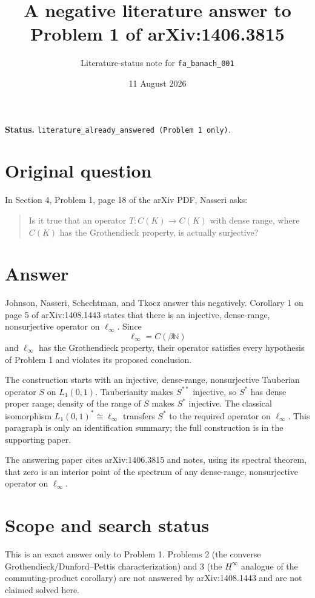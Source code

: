 \documentclass[11pt]{article}
\title{A negative literature answer to Problem 1 of arXiv:1406.3815}
\author{Literature-status note for \texttt{fa\_banach\_001}}
\date{11 August 2026}
\newcommand{\ellinf}{\ell_\infty}
\begin{document}
\maketitle

\noindent\textbf{Status.}
\texttt{literature\_already\_answered (Problem 1 only)}.

\section*{Original question}

In Section 4, Problem 1, page 18 of the arXiv PDF, Nasseri
\cite{Nasseri2014} asks:
\begin{quote}
Is it true that an operator $T:C(K)\to C(K)$ with dense range, where
$C(K)$ has the Grothendieck property, is actually surjective?
\end{quote}

\section*{Answer}

Johnson, Nasseri, Schechtman, and Tkocz \cite{JNST2015} answer this
negatively.  Corollary 1 on page 5 of arXiv:1408.1443 states that there is an
injective, dense-range, nonsurjective operator on $\ellinf$.  Since
\[
 \ellinf=C(\beta\mathbb N)
\]
and $\ellinf$ has the Grothendieck property, their operator satisfies every
hypothesis of Problem 1 and violates its proposed conclusion.

The construction starts with an injective, dense-range, nonsurjective
Tauberian operator $S$ on $L_1(0,1)$.  Tauberianity makes $S^{**}$ injective,
so $S^*$ has dense proper range; density of the range of $S$ makes $S^*$
injective.  The classical isomorphism $L_1(0,1)^*\cong\ellinf$ transfers
$S^*$ to the required operator on $\ellinf$.  This paragraph is only an
identification summary; the full construction is in the supporting paper.

The answering paper cites arXiv:1406.3815 and notes, using its spectral
theorem, that zero is an interior point of the spectrum of any dense-range,
nonsurjective operator on $\ellinf$.

\section*{Scope and search status}

This is an exact answer only to Problem 1.  Problems 2 (the converse
Grothendieck/Dunford--Pettis characterization) and 3 (the $H^\infty$ analogue
of the commuting-product corollary) are not answered by arXiv:1408.1443 and
are not claimed solved here.
\end{document}
